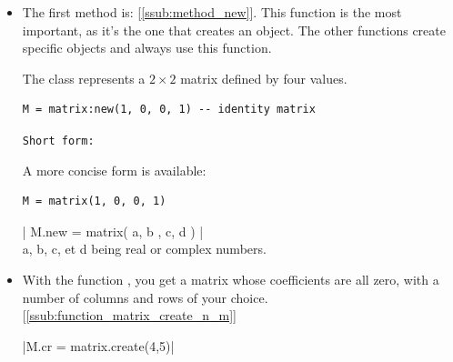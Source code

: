 \begin{itemize}

\item  The first method is: [\ref{ssub:method_new}]. This function is the most important, as it's the one that creates an object. The other functions create specific objects and always use this function.

The  class represents a $2\times2$ matrix defined by four values.

\begin{mybox}
\begin{verbatim}
M = matrix:new(1, 0, 0, 1) -- identity matrix
\end{verbatim}
\end{mybox}

\texttt{Short form: }

A more concise form is available:

\begin{mybox}
\begin{verbatim}
M = matrix(1, 0, 0, 1)
\end{verbatim}
\end{mybox}


\begin{mybox}
   | M.new = matrix({ { a, b }, { c, d } }) | \\
   a, b, c, et d being real or complex numbers.
\end{mybox}

\begin{minipage}{.3\textwidth}
\end{minipage}
\begin{minipage}{.6\textwidth}
\begin{tkzexample}
\end{tkzexample}
\end{minipage}


\item With the function , you get a matrix whose coefficients are all zero, with a number of columns and rows of your choice. [\ref{ssub:function_matrix_create_n_m}]

  \begin{mybox}
  |M.cr = matrix.create(4,5)|
  \end{mybox}


\end{itemize}
